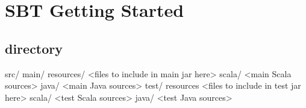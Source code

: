 \documentclass[12pt]{article}
\begin{document}
\maketitle

\section{SBT Getting Started}
\subsection{directory}
src/
  main/
    resources/
       <files to include in main jar here>
    scala/
       <main Scala sources>
    java/
       <main Java sources>
  test/
    resources
       <files to include in test jar here>
    scala/
       <test Scala sources>
    java/
       <test Java sources>
\end{document}
